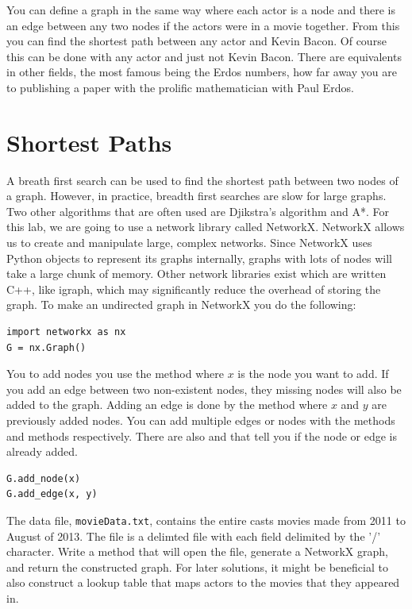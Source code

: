 You can define a graph in the same way where each actor is a node and there is an edge between any two nodes if the actors were in a movie together. From this you can find the shortest path between any actor and Kevin Bacon. Of course this can be done with any actor and just not Kevin Bacon. There are equivalents in other fields, the most famous being the Erdos numbers, how far away you are to publishing a paper with the prolific mathematician with Paul Erdos.

\section*{Shortest Paths}
A breath first search can be used to find the shortest path between two nodes of a graph.  However, in practice, breadth first searches are slow for large graphs. Two other algorithms that are often used are Djikstra's algorithm and A*. For this lab, we are going to use a network library called NetworkX. NetworkX allows us to create and manipulate large, complex networks.  Since NetworkX uses Python objects to represent its graphs internally, graphs with lots of nodes will take a large chunk of memory.  Other network libraries exist which are written C++, like igraph, which may significantly reduce the overhead of storing the graph.
To make an undirected graph in NetworkX you do the following:
\begin{lstlisting}
import networkx as nx
G = nx.Graph()
\end{lstlisting}
You to add nodes you use the  method where $x$ is the node you want to add.  If you add an edge between two non-existent nodes, they missing nodes will also be added to the graph. Adding an edge is done by the  method where $x$ and $y$ are previously added nodes. You can add multiple edges or nodes with the methods  and  methods respectively.  There are also  and  that tell you if the node or edge is already added.
\begin{lstlisting}
G.add_node(x)
G.add_edge(x, y)
\end{lstlisting}

\begin{problem}
The data file, \texttt{movieData.txt}, contains the entire casts movies made from 2011 to August of 2013. The file is a delimted file with each field delimited by the '/' character.
Write a method that will open the file, generate a NetworkX graph, and return the constructed graph.
For later solutions, it might be beneficial to also construct a lookup table that maps actors to the movies that they appeared in.
\end{problem}

